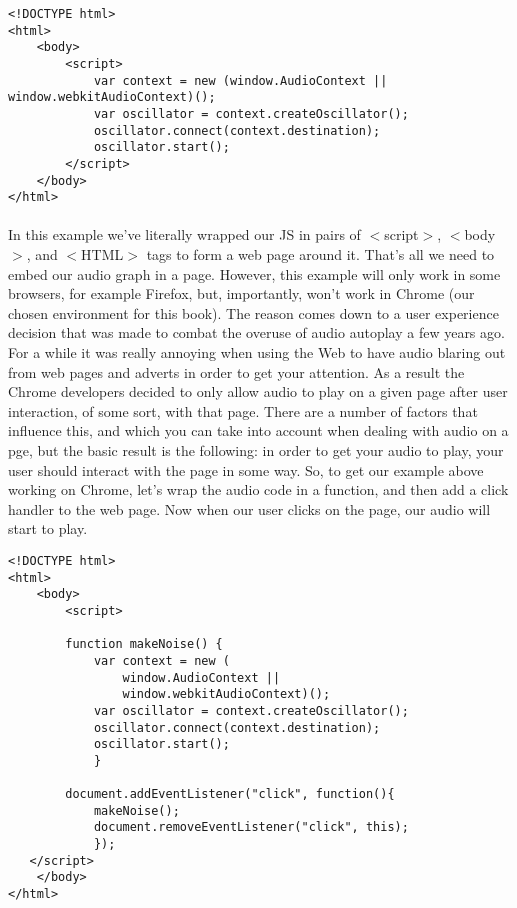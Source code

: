 \begin{lstlisting}
<!DOCTYPE html>
<html>
    <body>
        <script>
            var context = new (window.AudioContext || window.webkitAudioContext)();
            var oscillator = context.createOscillator();
            oscillator.connect(context.destination);
            oscillator.start();
        </script>
    </body>
</html>
\end{lstlisting}

\paragraph{} In this example we've literally wrapped our JS in pairs of $<$script$>$, $<$body$>$, and $<$HTML$>$ tags to form a web page around it. That's all we need to embed our audio graph in a page. However, this example will only work in some browsers, for example Firefox, but, importantly, won't work in Chrome (our chosen environment for this book). The reason comes down to a user experience decision that was made to combat the overuse of audio autoplay a few years ago. For a while it was really annoying when using the Web to have audio blaring out from web pages and adverts in order to get your attention. As a result the Chrome developers decided to only allow audio to play on a given page after user interaction, of some sort, with that page. There are a number of factors that influence this, and which you can take into account when dealing with audio on a pge, but the basic result is the following: in order to get your audio to play, your user should interact with the page in some way. So, to get our example above working on Chrome, let's wrap the audio code in a function, and then add a click handler to the web page. Now when our user clicks on the page, our audio will start to play.

\begin{lstlisting}
<!DOCTYPE html>
<html>
    <body>
        <script>
            
        function makeNoise() {
            var context = new (
                window.AudioContext || 
                window.webkitAudioContext)();
            var oscillator = context.createOscillator();
            oscillator.connect(context.destination);
            oscillator.start();
            }

        document.addEventListener("click", function(){
            makeNoise();
            document.removeEventListener("click", this);
            });
   </script>
    </body>
</html>
\end{lstlisting}

